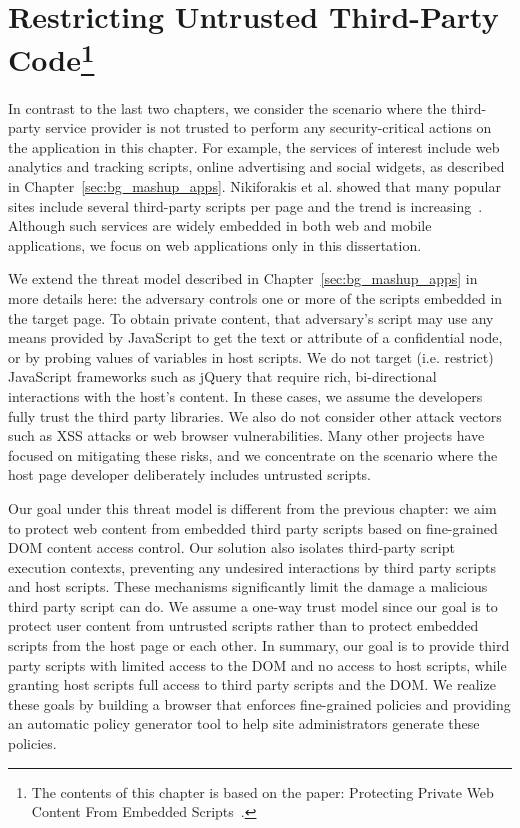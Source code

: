 \chapter[Restricting Untrusted Third-Party Code] {Restricting Untrusted Third-Party Code\footnote{The contents of this chapter is based on the paper: Protecting Private Web Content From Embedded Scripts~\cite{Zhou-ESORICS}.}}
\label{sec:esorics}

In contrast to the last two chapters, we consider the scenario where the third-party service provider is not trusted to perform any security-critical actions on the application in this chapter.  For example, the services of interest include web analytics and tracking scripts, online advertising and social widgets, as described in Chapter~\ref{sec:bg_mashup_apps}.  Nikiforakis et al. showed that many popular sites include several third-party scripts per page and the trend is increasing~\cite{Nikiforakis:2012:YYI:2382196.2382274}.  Although such services are widely embedded in both web and mobile applications, we focus on web applications only in this dissertation.  

  We extend the threat model described in Chapter~\ref{sec:bg_mashup_apps} in more details here: the adversary controls one or more of the scripts embedded in the target page.  To obtain private content, that adversary's script may use any means provided by JavaScript to get the text or attribute of a confidential node, or by probing values of variables in host scripts.  We do not target (i.e. restrict) JavaScript frameworks such as jQuery that require rich, bi-direct\-ion\-al interactions with the host's content.  In these cases, we assume the developers fully trust the third party libraries.  We also do not consider other attack vectors such as XSS attacks or web browser vulnerabilities.  Many other projects have focused on mitigating these risks, and we concentrate on the scenario where the host page developer deliberately includes untrusted scripts.

Our goal under this threat model is different from the previous chapter: we aim to protect web content from embedded third party scripts based on fine-grained DOM content access control.  Our solution also isolates third-party script execution contexts, preventing any undesired interactions by third party scripts and host scripts.  These mechanisms significantly limit the damage a malicious third party script can do.  We assume a one-way trust model since our goal is to protect user content from untrusted scripts rather than to protect embedded scripts from the host page or each other.  In summary, our goal is to provide third party scripts with limited access to the DOM and no access to host scripts, while granting host scripts full access to third party scripts and the DOM.  We realize these goals by building a browser that enforces fine-grained policies and providing an automatic policy generator tool to help site administrators generate these policies.  

